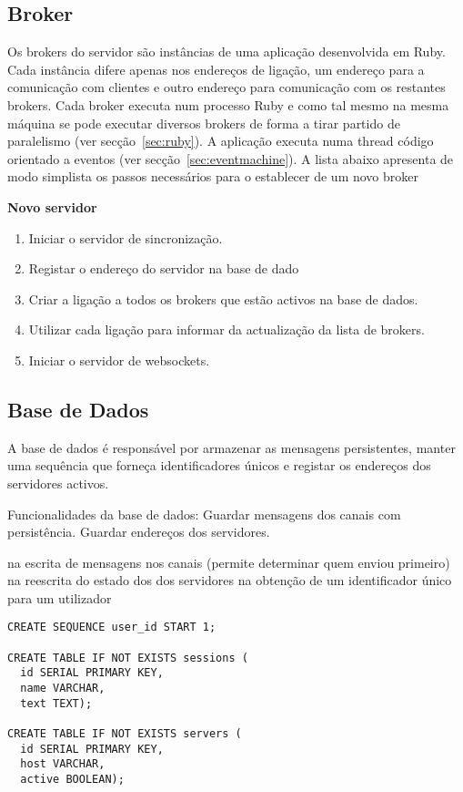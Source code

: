 \subsection{Broker}

Os brokers do servidor são instâncias de uma aplicação desenvolvida em Ruby. Cada instância difere apenas nos endereços de ligação, um endereço para a comunicação com clientes e outro endereço para comunicação com os restantes brokers.
Cada broker executa num processo Ruby e como tal mesmo na mesma máquina se pode executar diversos brokers de forma a tirar partido de paralelismo (ver secção~\ref{sec:ruby}).
A aplicação executa numa thread código orientado a eventos (ver secção~\ref{sec:eventmachine}). A lista abaixo apresenta de modo simplista os passos necessários para o establecer de um novo broker

\textbf{Novo servidor}
\begin{enumerate}
\item Iniciar o servidor de sincronização.
\item Registar o endereço do servidor na base de dado
\item Criar a ligação a todos os brokers que estão activos na base de dados.
\item Utilizar cada ligação para informar da actualização da lista de brokers.
\item Iniciar o servidor de websockets.
\end{enumerate}

\subsection{Base de Dados}
A base de dados é responsável por armazenar as mensagens persistentes, manter uma sequência que forneça identificadores únicos e registar os endereços dos servidores activos.

Funcionalidades da base de dados:
Guardar mensagens dos canais com persistência.
Guardar endereços dos servidores.

na escrita de mensagens nos canais (permite determinar quem enviou primeiro)
na reescrita do estado dos dos servidores
na obtenção de um identificador único para um utilizador

\renewcommand*{\lstlistingname}{SQL}
\begin{lstlisting}
CREATE SEQUENCE user_id START 1;

CREATE TABLE IF NOT EXISTS sessions (
  id SERIAL PRIMARY KEY,
  name VARCHAR,
  text TEXT);

CREATE TABLE IF NOT EXISTS servers (
  id SERIAL PRIMARY KEY,
  host VARCHAR,
  active BOOLEAN);
\end{lstlisting}

